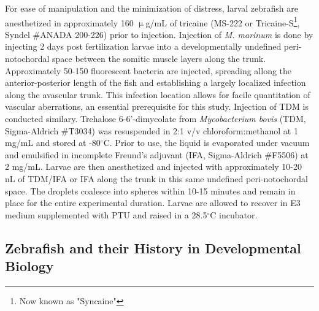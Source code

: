 For ease of manipulation and the minimization of distress, larval zebrafish are anesthetized in approximately 160 $\upmu$g/mL of tricaine (MS-222 or Tricaine-S\footnote{Now known as "Syncaine"}, Syndel \#ANADA 200-226) prior to injection. Injection of \textit{M. marinum} is done by injecting 2 days post fertilization larvae into a developmentally undefined peri-notochordal space between the somitic muscle layers along the trunk. Approximately 50-150 fluorescent bacteria are injected, spreading allong the anterior-posterior length of the fish and establishing a largely localized infection along the avascular trunk. This infection location allows for facile quantitation of vascular aberrations, an essential prerequisite for this study. Injection of TDM is conducted similary. Trehalose 6-6'-dimycolate from \textit{Mycobacterium bovis} (TDM, Sigma-Aldrich \#T3034) was resuspended in 2:1 v/v chloroform:methanol at 1 mg/mL and stored at -80$^{\circ}$C. Prior to use, the liquid is evaporated under vacuum and emulsified in incomplete Freund's adjuvant (IFA, Sigma-Aldrich \#F5506) at 2 mg/mL. Larvae are then anesthetized and injected with approximately 10-20 nL of TDM/IFA or IFA along the trunk in this same undefined peri-notochordal space. The droplets coalesce into spheres within 10-15 minutes and remain in place for the entire experimental duration. Larvae are allowed to recover in E3 medium supplemented with PTU and raised in a 28.5$^{\circ}$C incubator.

\subsection{Zebrafish and their History in Developmental Biology}


